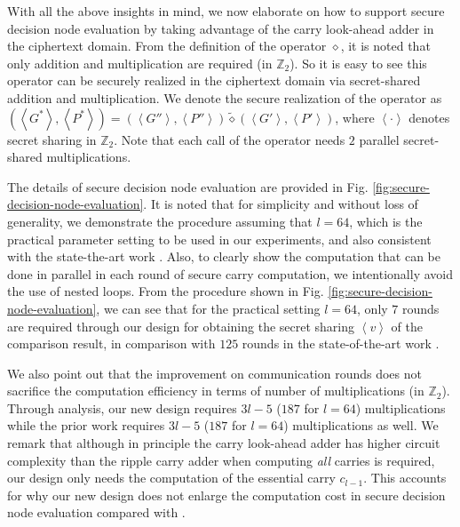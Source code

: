 \documentclass[10pt,journal,compsoc]{IEEEtran}
\begin{document}
With all the above insights  in mind, we now elaborate on how to support secure decision node evaluation by taking advantage of the carry look-ahead adder in the ciphertext domain.
% 
From the definition of the operator $\diamond$, it is noted that only addition and multiplication are required (in $\mathbb{Z}_2$).
%
So it is easy to see this operator can be securely realized in the ciphertext domain via secret-shared addition and multiplication.
%
We denote the secure realization of the operator as $(\left\langle{G^*}\right\rangle,\left\langle{P^*}\right\rangle)=(\left\langle{G''}\right\rangle,\left\langle{P''}\right\rangle) \tilde{\diamond} (\left\langle{G'}\right\rangle,\left\langle{P'}\right\rangle)$, where $\left\langle{\cdot}\right\rangle$ denotes secret sharing in $\mathbb{Z}_2$.
%
Note that each call of the operator needs $2$ parallel secret-shared multiplications.
%



The details of secure decision node evaluation are provided in Fig. \ref{fig:secure-decision-node-evaluation}.
%
It is noted that for simplicity and without loss of generality, we demonstrate the procedure assuming that $l=64$, which is the practical parameter setting to be used in our experiments, and also consistent with the state-the-art work \cite{ZhengDWWN20}.
%
Also, to clearly show the computation that can be done in parallel in each round of secure carry computation, we intentionally avoid the use of nested loops.
%
%
%
From the procedure shown in Fig. \ref{fig:secure-decision-node-evaluation}, we can see that for the practical setting $l=64$, only $7$ rounds are required through our design for obtaining the secret sharing $\left\langle{v}\right\rangle$ of the comparison result, in comparison with $125$ rounds in the state-of-the-art work \cite{ZhengDWWN20}.
%


We also point out that the improvement on communication rounds does not sacrifice the computation efficiency in terms of number of multiplications (in $\mathbb{Z}_2$).
%
Through analysis, our new design requires $3l-5$ ($187$ for $l=64$) multiplications while the prior work requires $3l-5$ ($187$ for $l=64$) multiplications as well.
%
We remark that although in principle the carry look-ahead adder has higher circuit complexity than the ripple carry adder when computing \emph{all} carries is required, our design only needs the computation of the essential carry $c_{l-1}$.
%
This accounts for why our new design does not enlarge the computation cost in secure decision node evaluation compared with \cite{ZhengDWWN20}. 
\end{document}

